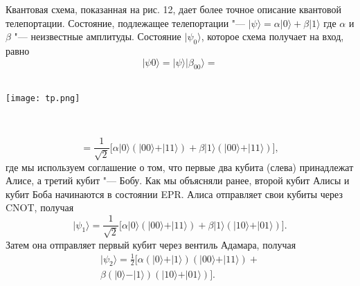 \begin{multicols}{2}
{        Квантовая схема, показанная на рис. 12, дает более точное описание квантовой
        телепортации. Состояние, подлежащее телепортации "--- $\vert\psi\rangle=\alpha\vert0\rangle+\beta\vert1\rangle$ где $\alpha$ и $\beta$ "--- неизвестные
        амплитуды. Состояние $\vert\psi_{0}\rangle$, которое схема получает на вход, равно
        \begin{equation}
            \vert\psi{0}\rangle = \vert\psi\rangle\vert\beta_{00}\rangle=
        \end{equation}
    }\\
    \begin{flushleft}
        \begin{minipage}{0.3\textwidth}{\texttt{[image: tp.png]}}
        \end{minipage}\\
        \vspace{0.3cm}
    \end{flushleft}
    \normalsize{
        \begin{equation}
            =\frac{1}{\sqrt2}\big[\alpha\vert0\rangle(\vert00\rangle+\vert11\rangle)+\beta\vert1\rangle(\vert00\rangle+\vert11\rangle)\big],
        \end{equation}
        где мы используем соглашение о том, что первые два кубита (слева) принадлежат Алисе, а
        третий кубит "--- Бобу. Как мы объясняли ранее, второй кубит Алисы и кубит Боба
        начинаются в состоянии EPR. Алиса отправляет свои кубиты через CNOT, получая
        \begin{equation}
            \vert\psi_{1}\rangle=\frac{1}{\sqrt2}\big[\alpha\vert0\rangle(\vert00\rangle+\vert11\rangle)+\beta\vert1\rangle(\vert10\rangle+\vert01\rangle)\big].
        \end{equation}
        Затем она отправляет первый кубит через вентиль Адамара, получая
        \begin{equation}
            \begin{split}
                \vert\psi_{2}\rangle=\frac{1}{2}\big[\alpha(\vert0\rangle+\vert1\rangle)(\vert00\rangle+\vert11\rangle)+\\\beta(\vert0\rangle-\vert1\rangle)(\vert10\rangle+\vert01\rangle)\big].

\end{split}
\end{equation}}
\end{multicols}
